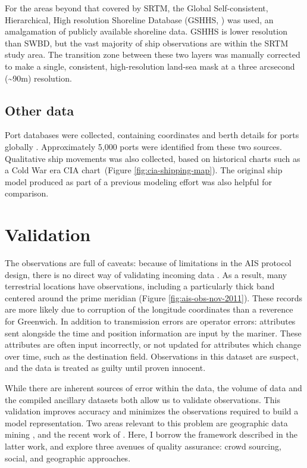 For the areas beyond that covered by SRTM, the Global Self-consistent, Hierarchical, High resolution Shoreline Database (GSHHS, \citealp{wessel1996global}) was used, an amalgamation of publicly available shoreline data. GSHHS is lower resolution than SWBD, but the vast majority of ship observations are within the SRTM study area. The transition zone between these two layers was manually corrected to make a single, consistent, high-resolution land-sea mask at a three arcsecond (\textasciitilde{}90m) resolution.

\subsection{Other data}
Port databases were collected, containing coordinates and berth details for ports globally \citep{Halpern2008,worldportindex}. Approximately 5,000 ports were identified %
from these two sources.  Qualitative ship movements was also collected, based on historical charts such as a Cold War era CIA chart~(Figure \ref{fig:cia-shipping-map}). The original ship model produced as part of a previous modeling effort \citep{Halpern2008} was also helpful for comparison.

\section{Validation}

The observations are full of caveats: because of limitations in the AIS protocol design, there is no direct way of validating incoming data \citep{RaymondInPress}.  As a result, many terrestrial locations have observations, including a particularly thick band centered around the prime meridian (Figure \ref{fig:ais-obs-nov-2011}). These records are more likely due to corruption of the longitude coordinates than a reverence for Greenwich. In addition to transmission errors are operator errors: attributes sent alongside the time and position information are input by the mariner. These attributes are often input incorrectly, or not updated for attributes which change over time, such as the destination field. Observations in this dataset are suspect, and the data is treated as guilty until proven innocent.

While there are inherent sources of error within the data, the volume of data and the compiled ancillary datasets both allow us to validate observations. This validation improves accuracy and minimizes the observations required to build a model representation. Two areas relevant to this problem are geographic data mining \citep{miller2009geographic}, and the recent work of \cite{goodchildli2012}. Here, I borrow the framework described in the latter work, and explore three avenues of quality assurance: crowd sourcing, social, and geographic approaches.

